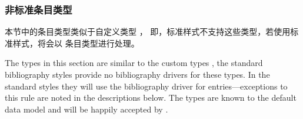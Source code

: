\subsubsection{非标准条目类型}
\label{bib:typ:ctm}


本节中的条目类型类似于自定义类型 ，
即，标准样式不支持这些类型，若使用标准样式，将会以  条目类型进行处理。

The types in this section are similar to the custom types , \ie the standard bibliography styles provide no bibliography drivers for these types. In the standard styles they will use the bibliography driver for  entries---exceptions to this rule are noted in the descriptions below. The types are known to the default data model and will be happily accepted by \biber.

